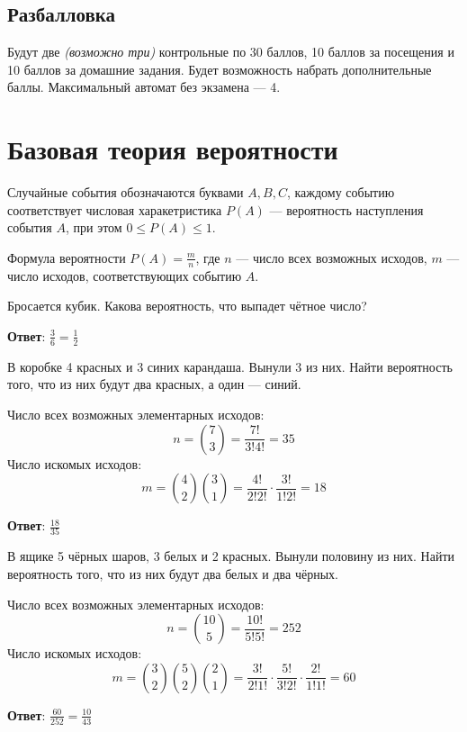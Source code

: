 

\cfoot{}



\subsection*{Разбалловка}

Будут две \textit{(возможно три)} контрольные по 30 баллов, 10 баллов за посещения и 10 баллов за домашние задания. Будет возможность набрать дополнительные баллы. Максимальный автомат без экзамена --- 4.

\section*{Базовая теория вероятности}

Случайные события обозначаются буквами \(A, B, C\), каждому событию соответствует числовая харакетристика \(P(A)\) --- вероятность наступления события \(A\), при этом \(0 \leq P(A) \leq 1\).

Формула вероятности \(P(A) = \frac{m}{n}\), где \(n\) --- число всех возможных исходов, \(m\) --- число исходов, соответствующих событию \(A\).

\begin{exercise}
    Бросается кубик. Какова вероятность, что выпадет чётное число?

    \textbf{Ответ}: \(\frac{3}{6} = \frac{1}{2}\)
\end{exercise}

\begin{exercise}
    В коробке 4 красных и 3 синих карандаша. Вынули 3 из них. Найти вероятность того, что из них будут два красных, а один --- синий.

    Число всех возможных элементарных исходов:
    \[n = \binom{7}{3} = \frac{7!}{3!4!} = 35\]
    Число искомых исходов:
    \[m = \binom{4}{2} \binom{3}{1} = \frac{4!}{2!2!} \cdot \frac{3!}{1!2!} = 18\]

    \textbf{Ответ}: \(\frac{18}{35}\)
\end{exercise}

\begin{exercise}
    В ящике 5 чёрных шаров, 3 белых и 2 красных. Вынули половину из них. Найти вероятность того, что из них будут два белых и два чёрных.

    Число всех возможных элементарных исходов:
    \[n = \binom{10}{5} = \frac{10!}{5!5!} = 252\]
    Число искомых исходов:
    \[m = \binom{3}{2} \binom{5}{2} \binom{2}{1} = \frac{3!}{2!1!} \cdot \frac{5!}{3!2!} \cdot \frac{2!}{1!1!} = 60\]

    \textbf{Ответ}: \(\frac{60}{252} = \frac{10}{43} \)
\end{exercise}

